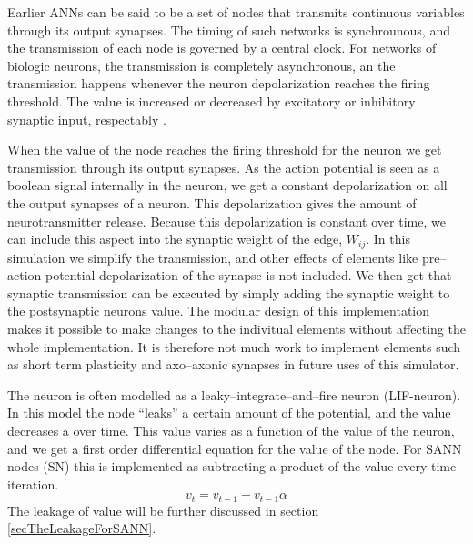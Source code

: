	Earlier ANNs can be said to be a set of nodes that transmits continuous variables through its output synapses. The timing of such networks is synchrounous, and the transmission of each node is governed by a central clock.
	For networks of biologic neurons, the transmission is completely asynchronous, an the transmission happens whenever the neuron depolarization reaches the firing threshold.
	The value is increased or decreased by excitatory or inhibitory synaptic input, respectably .
	
	When the value of the node reaches the firing threshold for the neuron we get transmission through its output synapses.
	As the action potential is seen as a boolean signal internally in the neuron, we get a constant depolarization on all the output synapses of a neuron.
	This depolarization gives the amount of neurotransmitter release. 
	Because this depolarization is constant over time, we can include this aspect into the synaptic weight of the edge, $W_{ij}$.
	In this simulation we simplify the transmission, and other effects of elements like pre--action potential depolarization of the synapse is not included.%
	We then get that synaptic transmission can be executed by simply adding the synaptic weight to the postsynaptic neurons value.
	The modular design of this implementation makes it possible to make changes to the indivitual elements without affecting the whole implementation.
	It is therefore not much work to implement elements such as short term plasticity and axo--axonic synapses in future uses of this simulator.

	The neuron is often modelled as a leaky--integrate--and--fire neuron (LIF-neuron). %
	In this model the node ``leaks'' a certain amount of the potential, and the value decreases a over time. 
	This value varies as a function of the value of the neuron, and we get a first order differential equation for the value of the node.
	For SANN nodes (SN) this is implemented as subtracting a product of the value every time iteration. 
	\begin{equation}
	v_t = v_{t-1} - v_{t-1}  \alpha %
	\end{equation}
	The leakage of value will be further discussed in section \ref{secTheLeakageForSANN}.

